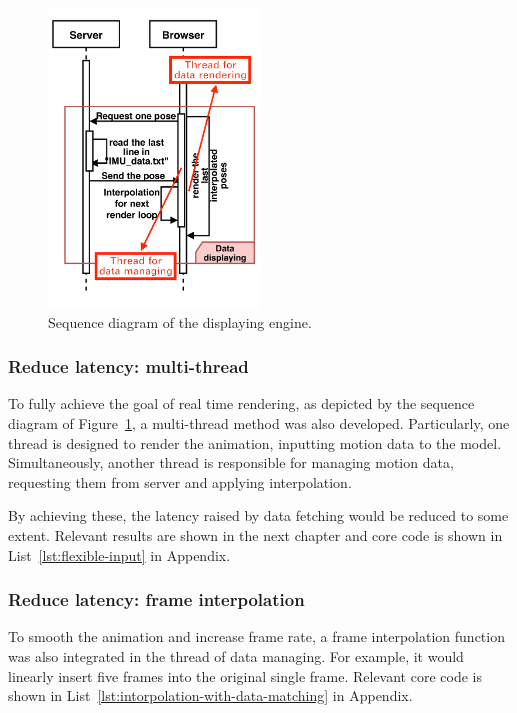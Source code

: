 \begin{figure}[htbp]
	\centering
	\includegraphics[width=0.5\textwidth]{
		fileForWriting/browser_sequence}
	\caption[Sequence diagram of the displaying engine]{Sequence diagram of the displaying engine.}
	\label{fig:browser_sequence}
\end{figure}


\subsubsection{Reduce latency: multi-thread}
To fully achieve the goal of real time rendering, as depicted by the sequence diagram of Figure~\ref{fig:browser_sequence}, a multi-thread method was also developed.
Particularly, one thread is designed to render the animation, inputting motion data to the model.
Simultaneously, another thread is responsible for managing motion data, requesting them from server and applying interpolation.

By achieving these, the latency raised by data fetching would be reduced to some extent.
Relevant results are shown in the next chapter and core code is shown in
List~\ref{lst:flexible-input} in Appendix.


\subsubsection{Reduce latency: frame interpolation}
To smooth the animation and increase frame rate, a frame interpolation function was also integrated in the thread of data managing.
For example, it would linearly insert five frames into the original single frame.
Relevant core code is shown in List~\ref{lst:intorpolation-with-data-matching} in Appendix.


